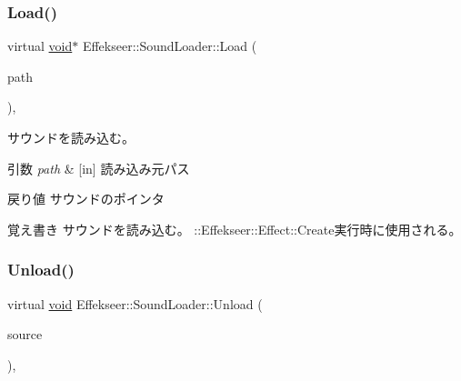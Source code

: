\subsubsection{\texorpdfstring{Load()}{Load()}}
{\footnotesize\ttfamily virtual \mbox{\hyperlink{namespace_effekseer_ab34c4088e512200cf4c2716f168deb56}{void}}$\ast$ Effekseer\+::\+Sound\+Loader\+::\+Load (\begin{DoxyParamCaption}\item[{const \mbox{\hyperlink{_effekseer_8h_aca7eb5de6dd019c19ac58ea35a193f2f}{E\+F\+K\+\_\+\+C\+H\+AR}} $\ast$}]{path }\end{DoxyParamCaption})\hspace{0.3cm}{\ttfamily [inline]}, {\ttfamily [virtual]}}



サウンドを読み込む。 


\begin{DoxyParams}{引数}
{\em path} & \mbox{[}in\mbox{]} 読み込み元パス \\
\hline
\end{DoxyParams}
\begin{DoxyReturn}{戻り値}
サウンドのポインタ 
\end{DoxyReturn}
\begin{DoxyNote}{覚え書き}
サウンドを読み込む。 \+::\+Effekseer\+::\+Effect\+::\+Create実行時に使用される。 
\end{DoxyNote}
\mbox{\label{class_effekseer_1_1_sound_loader_aa0b0fda4cbd0f9a6b9bf1babaef93679}} 
\subsubsection{\texorpdfstring{Unload()}{Unload()}}
{\footnotesize\ttfamily virtual \mbox{\hyperlink{namespace_effekseer_ab34c4088e512200cf4c2716f168deb56}{void}} Effekseer\+::\+Sound\+Loader\+::\+Unload (\begin{DoxyParamCaption}\item[{\mbox{\hyperlink{namespace_effekseer_ab34c4088e512200cf4c2716f168deb56}{void}} $\ast$}]{source }\end{DoxyParamCaption})\hspace{0.3cm}{\ttfamily [inline]}, {\ttfamily [virtual]}}



